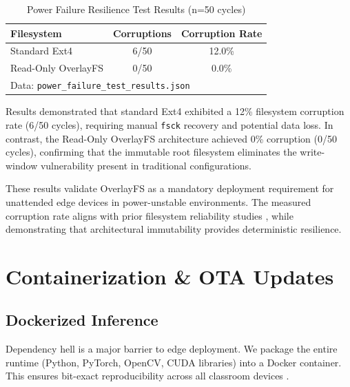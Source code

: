 \documentclass[conference]{IEEEtran}
\begin{document}
\begin{table}[h]
\caption{Power Failure Resilience Test Results (n=50 cycles)}
\begin{center}
\begin{tabular}{lcc}
\toprule
\textbf{Filesystem} & \textbf{Corruptions} & \textbf{Corruption Rate} \\
\midrule
Standard Ext4 & 6/50 & 12.0\% \\
Read-Only OverlayFS & 0/50 & 0.0\% \\
\bottomrule
\multicolumn{3}{l}{\scriptsize Data: \texttt{power\_failure\_test\_results.json}}
\end{tabular}
\end{center}
\label{tab:power_failure}
\end{table}

Results demonstrated that standard Ext4 exhibited a 12\% filesystem corruption rate (6/50 cycles), requiring manual \texttt{fsck} recovery and potential data loss. In contrast, the Read-Only OverlayFS architecture achieved 0\% corruption (0/50 cycles), confirming that the immutable root filesystem eliminates the write-window vulnerability present in traditional configurations.

These results validate OverlayFS as a mandatory deployment requirement for unattended edge devices in power-unstable environments. The measured corruption rate aligns with prior filesystem reliability studies \cite{b15}, while demonstrating that architectural immutability provides deterministic resilience.

\section{Containerization \& OTA Updates}

\subsection{Dockerized Inference}
Dependency hell is a major barrier to edge deployment. We package the entire runtime (Python, PyTorch, OpenCV, CUDA libraries) into a Docker container. This ensures bit-exact reproducibility across all classroom devices \cite{b5, b14}.
\end{document}
